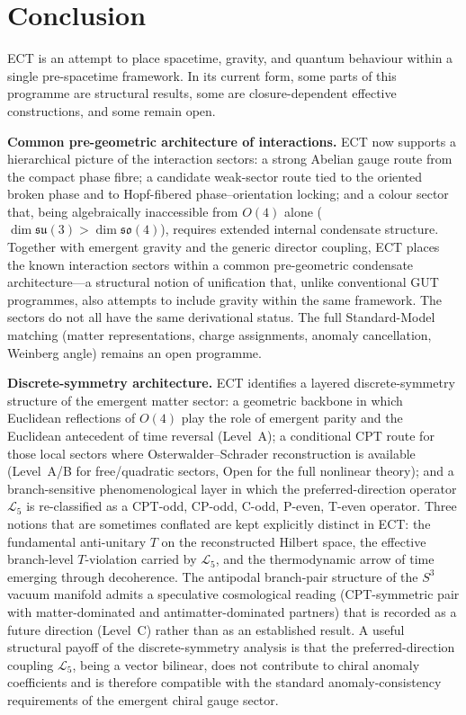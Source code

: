 \documentclass[11pt,a4paper]{article}
\begin{document}
\section{Conclusion}

ECT is an attempt to place spacetime, gravity, and quantum behaviour within a single pre-spacetime framework. In its current form, some parts of this programme are structural results, some are closure-dependent effective constructions, and some remain open.

\textbf{Common pre-geometric architecture of interactions.}
ECT now supports a hierarchical picture of the interaction sectors: a strong Abelian gauge route from the compact phase fibre; a candidate weak-sector route tied to the oriented broken phase and to Hopf-fibered phase--orientation locking; and a colour sector that, being algebraically inaccessible from $O(4)$ alone ($\dim\mathfrak{su}(3)>\dim\mathfrak{so}(4)$), requires extended internal condensate structure. Together with emergent gravity and the generic director coupling, ECT places the known interaction sectors within a common pre-geometric condensate architecture---a structural notion of unification that, unlike conventional GUT programmes, also attempts to include gravity within the same framework. The sectors do not all have the same derivational status. The full Standard-Model matching (matter representations, charge assignments, anomaly cancellation, Weinberg angle) remains an open programme.

\textbf{Discrete-symmetry architecture.}
ECT identifies a layered discrete-symmetry structure of the emergent matter sector: a geometric backbone in which Euclidean reflections of $O(4)$ play the role of emergent parity and the Euclidean antecedent of time reversal (Level~A); a conditional CPT route for those local sectors where Osterwalder--Schrader reconstruction is available (Level~A/B for free/quadratic sectors, Open for the full nonlinear theory); and a branch-sensitive phenomenological layer in which the preferred-direction operator $\mathcal{L}_5$ is re-classified as a CPT-odd, CP-odd, C-odd, P-even, T-even operator. Three notions that are sometimes conflated are kept explicitly distinct in ECT: the fundamental anti-unitary $T$ on the reconstructed Hilbert space, the effective branch-level $T$-violation carried by $\mathcal{L}_5$, and the thermodynamic arrow of time emerging through decoherence. The antipodal branch-pair structure of the $S^3$ vacuum manifold admits a speculative cosmological reading (CPT-symmetric pair with matter-dominated and antimatter-dominated partners) that is recorded as a future direction (Level~C) rather than as an established result. A useful structural payoff of the discrete-symmetry analysis is that the preferred-direction coupling $\mathcal{L}_5$, being a vector bilinear, does not contribute to chiral anomaly coefficients and is therefore compatible with the standard anomaly-consistency requirements of the emergent chiral gauge sector.
\end{document}
